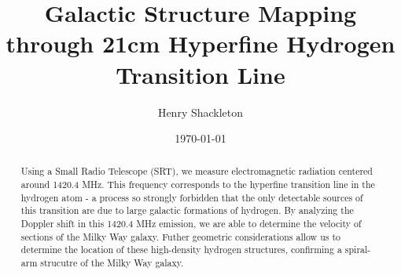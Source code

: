 \usepackage{graphicx}      %
\usepackage{lipsum}
\usepackage{float}
\usepackage{bm}            %
\usepackage{physics}
\usepackage{tensor}
\usepackage{gensymb}
\usepackage[colorlinks=true]{hyperref}  %




\title{Galactic Structure Mapping through 21cm Hyperfine Hydrogen Transition Line}
\author{Henry Shackleton}
\date{\today}


\begin{abstract}
  Using a Small Radio Telescope (SRT), we measure electromagnetic radiation centered around 1420.4 MHz. This frequency corresponds to the hyperfine transition line in the hydrogen atom - a process so strongly forbidden that the only detectable sources of this transition are due to large galactic formations of hydrogen. By analyzing the Doppler shift in this 1420.4 MHz emission, we are able to determine the velocity of sections of the Milky Way galaxy. Futher geometric considerations allow us to determine the location of these high-density hydrogen structures, confirming a spiral-arm strucutre of the Milky Way galaxy.
\end{abstract}

\maketitle

